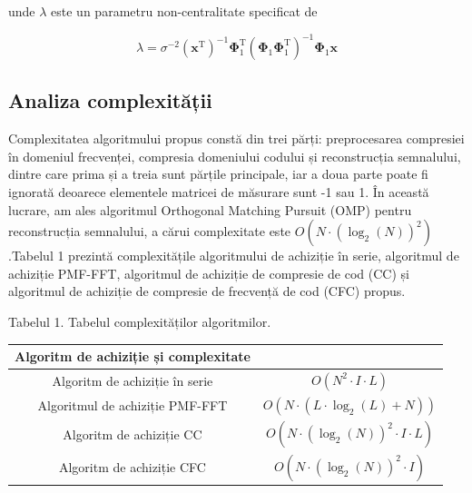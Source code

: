 \documentclass[10pt]{report}
\begin{document}
unde \(\lambda\) este un parametru non-centralitate specificat de

\begin{equation}
    \lambda=\sigma^{-2}\left(\mathbf{x}^{\mathrm{T}}\right)^{-1} \boldsymbol{\Phi}_{1}^{\mathrm{T }}\left(\mathbf{\Phi}_{1} \mathbf{\Phi}_{1}^{\mathrm{T}}\right)^{-1} \mathbf{\Phi}_{1 } \mathbf{x}
\end{equation}


\subsection*{Analiza complexității}
Complexitatea algoritmului propus constă din trei părți: preprocesarea compresiei în domeniul frecvenței, compresia domeniului codului și reconstrucția semnalului, dintre care prima și a treia sunt părțile principale, iar a doua parte poate fi ignorată deoarece elementele matricei de măsurare sunt -1 sau 1. În această lucrare, am ales algoritmul Orthogonal Matching Pursuit (OMP) pentru reconstrucția semnalului, a cărui complexitate este \(O\left(N \cdot\left(\log _{2}(N)\right)^{2}\right)\).\@ Tabelul 1 prezintă complexitățile algoritmului de achiziție în serie, algoritmul de achiziție PMF-FFT, algoritmul de achiziție de compresie de cod (CC) și algoritmul de achiziție de compresie de frecvență de cod (CFC) propus.

Tabelul 1. Tabelul complexităților algoritmilor.

\begin{center}
    \begin{tabular}{cc}
        \hline
        Algoritm de achiziție și complexitate                                                                    \\
        \hline
        Algoritm de achiziție în serie  & \(O\left(N^{2} \cdot I \cdot L\right)\)                                \\
        Algoritmul de achiziție PMF-FFT & \(O\left(N \cdot\left(L \cdot \log _{2}(L)+N\right)\right)\)           \\
        Algoritm de achiziție CC        & \(O\left(N \cdot\left(\log _{2}(N)\right)^{2} \cdot I \cdot L\right)\) \\
        Algoritm de achiziție CFC       & \(O\left(N \cdot\left(\log _{2}(N)\right)^{2} \cdot I\right)\)         \\
        \hline
    \end{tabular}
\end{center}
\end{document}
